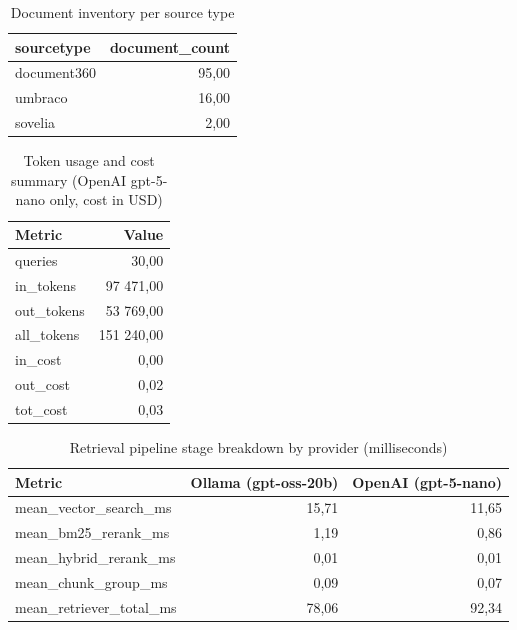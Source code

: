 \begin{table}[htbp]
    \centering
    \small
    \begin{tabular}{lr}
        \toprule
        sourcetype  & document\_count \\
        \midrule
        document360 & 95,00           \\
        umbraco     & 16,00           \\
        sovelia     & 2,00            \\
        \bottomrule
    \end{tabular}
    \caption{Document inventory per source type}
    \label{tab:document-inventory}
\end{table}

\begin{table}[htbp]
    \centering
    \small
    \begin{tabular}{lr}
        \toprule
        Metric      & Value      \\
        \midrule
        queries     & 30,00      \\
        in\_tokens  & 97 471,00  \\
        out\_tokens & 53 769,00  \\
        all\_tokens & 151 240,00 \\
        in\_cost    & 0,00       \\
        out\_cost   & 0,02       \\
        tot\_cost   & 0,03       \\
        \bottomrule
    \end{tabular}
    \caption{Token usage and cost summary (OpenAI gpt-5-nano only, cost in USD)}
    \label{tab:token-cost-summary}
\end{table}

\begin{table}[htbp]
    \centering
    \small
    \begin{tabular}{lrr}
        \toprule
        Metric                     & Ollama (gpt-oss-20b) & OpenAI (gpt-5-nano) \\
        \midrule
        mean\_vector\_search\_ms   & 15,71                & 11,65               \\
        mean\_bm25\_rerank\_ms     & 1,19                 & 0,86                \\
        mean\_hybrid\_rerank\_ms   & 0,01                 & 0,01                \\
        mean\_chunk\_group\_ms     & 0,09                 & 0,07                \\
        mean\_retriever\_total\_ms & 78,06                & 92,34               \\
        \bottomrule
    \end{tabular}
    \caption{Retrieval pipeline stage breakdown by provider (milliseconds)}
    \label{tab:retrieval-stages}
\end{table}

